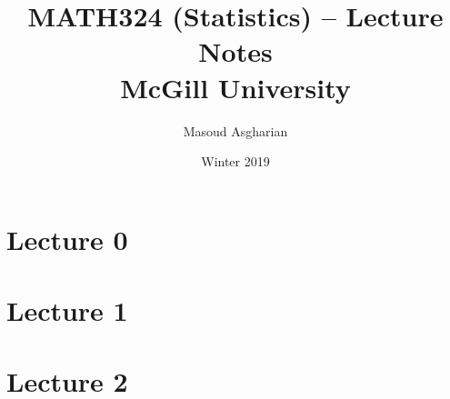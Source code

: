 \documentclass[11pt,twoside,a4paper,fleqn]{article}
\title{MATH324 (Statistics) -- Lecture Notes\\McGill University}
\date{Winter 2019}
\author{Masoud Asgharian}
\theoremstyle{plain}
\begin{document}
\maketitle

\newcommand{\nexists}{\not\exists}
\newcommand\tab[1][1cm]{\hspace*{#1}}

\tableofcontents
\newpage
\section{Lecture 0}
\section{Lecture 1}

\section{Lecture 2}
\end{document}
